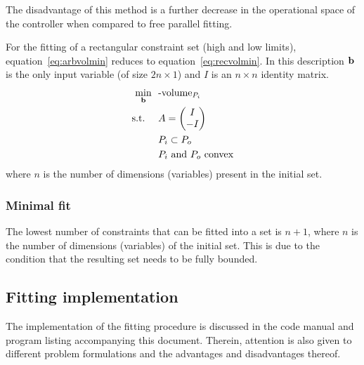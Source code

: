 The disadvantage of this method is a further decrease in the operational space of the controller when compared to free parallel fitting.

For the fitting of a rectangular constraint set (high and low limits), equation~\ref{eq:arbvolmin} reduces to equation~\ref{eq:recvolmin}.
In this description ${\bf {b}}$ is the only input variable (of size $2n \times 1$) and $I$ is an $n\times n$ identity matrix.
\begin{align}
  \label{eq:recvolmin}
    \min_{{\bf {b}}}~~&\text{-volume}_{P_i}\\
    \text{s.t.}~~~~ &A = \begin{pmatrix} I \\ -I \end{pmatrix} \notag \\
                    &P_i \subset P_o \notag \\
                    &P_i \text{~and~} P_o \text{~convex} \notag
\end{align}
where $n$ is the number of dimensions (variables) present in the initial set.

\subsubsection{Minimal fit}
The lowest number of constraints that can be fitted into a set is $n+1$, where $n$ is the number of dimensions (variables) of the initial set.
This is due to the condition that the resulting set needs to be fully bounded.

\subsection{Fitting implementation}
The implementation of the fitting procedure is discussed in the code manual and program listing accompanying this document.
Therein, attention is also given to different problem formulations and the advantages and disadvantages thereof.


